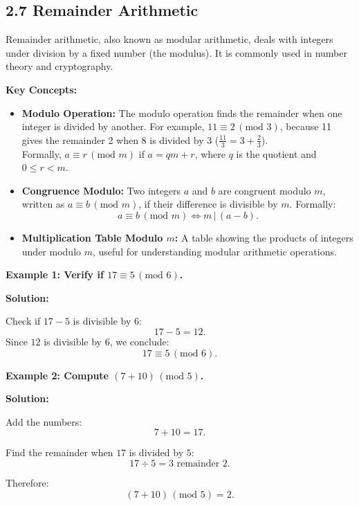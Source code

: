 
\subsection*{2.7 Remainder Arithmetic}
Remainder arithmetic, also known as modular arithmetic, deals with integers under division by a fixed number (the modulus). It is commonly used in number theory and cryptography.

\textbf{Key Concepts:}
\begin{itemize}
    \item \textbf{Modulo Operation:} The modulo operation finds the remainder when one integer is divided by another. For example, $11 \equiv 2 \,(\text{mod } 3)$, because 11 gives the remainder 2 when $8$ is divided by $3$ ($\frac{11}{3} = 3 + \frac{2}{3}$). \\Formally, $a \equiv r \,(\text{mod } m)$ if $a = qm + r$, where $q$ is the quotient and $0 \leq r < m$.

    \item \textbf{Congruence Modulo:} Two integers $a$ and $b$ are congruent modulo $m$, written as $a \equiv b \,(\text{mod } m)$, if their difference is divisible by $m$. Formally:
    \[
    a \equiv b \,(\text{mod } m) \iff m \,|\, (a - b).
    \]
    
    \item \textbf{Multiplication Table Modulo $m$:} A table showing the products of integers under modulo $m$, useful for understanding modular arithmetic operations.
\end{itemize}

\begin{flushleft}
\textbf{Example 1: Verify if $17 \equiv 5 \,(\text{mod } 6)$.}

\vspace{0.5cm}
\textbf{Solution:}
\vspace{0.5cm}

Check if $17 - 5$ is divisible by 6:
\[
17 - 5 = 12.
\]
Since $12$ is divisible by $6$, we conclude:
\[
17 \equiv 5 \,(\text{mod } 6).
\]
\end{flushleft}

\begin{flushleft}
\textbf{Example 2: Compute $(7 + 10) \,(\text{mod } 5)$.}

\vspace{0.5cm}
\textbf{Solution:}
\vspace{0.5cm}

Add the numbers:
\[
7 + 10 = 17.
\]

Find the remainder when $17$ is divided by $5$:
\[
17 \div 5 = 3 \text{ remainder } 2.
\]

Therefore:
\[
(7 + 10) \,(\text{mod } 5) = 2.
\]
\end{flushleft}

